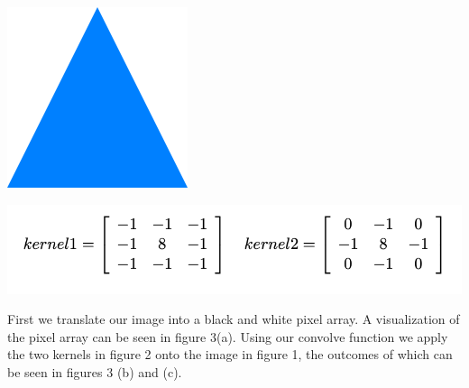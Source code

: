 \documentclass{article}
\begin{document}
\begin{center}
\includegraphics[width=.2\linewidth]{../triangle.png}
\end{center}

\begin{center}
\includegraphics[width=.6\linewidth]{k.png}
\end{center}

First we translate our image into a black and white pixel array. A visualization of the pixel array can be seen in figure 3(a). Using our convolve function we apply the two kernels in figure 2 onto the image in figure 1, the outcomes of which can be seen in figures 3 (b) and (c).
\end{document}
